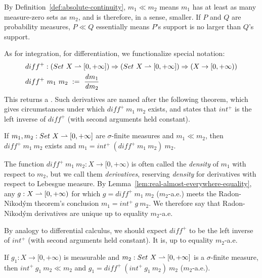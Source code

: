 By Definition~\ref{def:absolute-continuity}, $m_1 \ll m_2$ means $m_1$ has at least as many measure-zero sets as $m_2$, and is therefore, in a sense, smaller.
If $P$ and $Q$ are probability measures, $P \ll Q$ essentially means $P$'s support is no larger than $Q$'s support.

As for integration, for differentiation, we functionalize special notation:
\begin{equation}
\begin{aligned}
	&diff^+ : (Set~X \rightharpoonup [0,+\infty]) \Rightarrow (Set~X \rightharpoonup [0,+\infty]) \Rightarrow (X \to [0,+\infty)) \\
	&diff^+~m_1~m_2\ :=\ \frac{\mathit{d}m_1}{\mathit{d}m_2}
\end{aligned}
\label{eqn:int-diff-types}
\end{equation}
This returns a .
Such derivatives are named after the following theorem, which gives circumstances under which $diff^+~m_1~m_2$ exists, and states that $int^+$ is the left inverse of $diff^+$ (with second arguments held constant).

\begin{lemma}
\label{lem:radon-nikodym}
If $m_1,m_2 : Set~X \rightharpoonup [0,+\infty]$ are $\sigma$-finite measures and $m_1 \ll m_2$, then $diff^+~m_1~m_2$ exists and $m_1 = int^+~(diff^+~m_1~m_2)~m_2$.
\end{lemma}

The function $diff^+~m_1~m_2 : X \to [0,+\infty)$ is often called the \emph{density} of $m_1$ with respect to $m_2$, but we call them \emph{derivatives}, reserving \emph{density} for derivatives with respect to Lebesgue measure.
By Lemma~\ref{lem:real-almost-everywhere-equality}, any $g : X \rightharpoonup [0,+\infty)$ for which $g = diff^+~m_1~m_2$ ($m_2$-a.e.) meets the Radon-Nikod\'ym theorem's conclusion $m_1 = int^+~g~m_2$.
We therefore say that Radon-Nikod\'ym derivatives are unique up to equality $m_2$-a.e.

By analogy to differential calculus, we should expect $diff^+$ to be the left inverse of $int^+$ (with second arguments held constant).
It is, up to equality $m_2$-a.e.
\begin{lemma}
\label{lem:diff-left-inverse-int}
If $g_1 : X \to [0,+\infty)$ is measurable and $m_2 : Set~X \rightharpoonup [0,+\infty]$ is a $\sigma$-finite measure, then $int^+~g_1~m_2 \ll m_2$ and $g_1 = diff^+~(int^+~g_1~m_2)~m_2$ ($m_2$-a.e.).
\end{lemma}
\begin{comment}
\begin{proof}
\begin{align*}
	&int~(f_1 - diff^+~(int^+~f_1~m_2)~m_2)~m_2
\\
	&\tab=\ int~f_1~m_2 - int~(diff^+~(int^+~f_1~m_2)~m_2)~m_2
\\
	&\tab=\ int^+~f_1~m_2 - int^+~(diff^+~(int^+~f_1~m_2)~m_2)~m_2
\\
	&\tab=\ int^+~f_1~m_2 - int^+~f_1~m_2
\end{align*}
\end{proof}
\end{comment}

